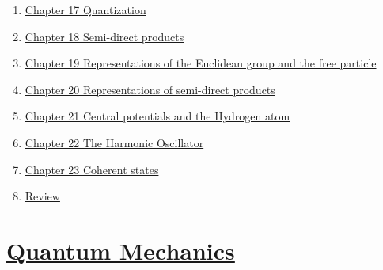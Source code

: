 \documentclass[11pt]{article}
\begin{document}
\begin{enumerate}
	\item 	\href{https://mp.weixin.qq.com/s/JJRMnCI-VCXFz5-Z_j7nAA}{Chapter 17 Quantization}	%
	\item 	\href{https://mp.weixin.qq.com/s/-d0bWe9gXQLIQb0XzXQI0g}{Chapter 18 Semi-direct products}	%
	\item 	\href{https://mp.weixin.qq.com/s/fpJ0DJv9HvA2zxzIcC4pcQ}{Chapter 19 Representations of the Euclidean group and the free particle}	%
	\item	\href{https://mp.weixin.qq.com/s/MLBRYA5iXhRgwJ2U4bX5Qw}{Chapter 20 Representations of semi-direct products}	%
	\item	\href{https://mp.weixin.qq.com/s/dlt1kqYFLczAjEugNfkS9g}{Chapter 21 Central potentials and the Hydrogen atom}	%
	\item	\href{https://mp.weixin.qq.com/s/b7164I4AgpJX3LWojDH2ow}{Chapter 22 The Harmonic Oscillator} 	%
	\item 	\href{https://mp.weixin.qq.com/s/JM1rcI4LJdch4xAuKJl2Ig}{Chapter 23 Coherent states}	%
	\item 	\href{https://mp.weixin.qq.com/s/I0ybs43H_HmjW8lY2VcxRA}{Review}	%
\end{enumerate}

\section*{\href{https://www.youtube.com/playlist?list=PLOaEOh8qMwDLeEdrwt3n8xLErYi9iQPY5}{Quantum Mechanics }}
\end{document}
